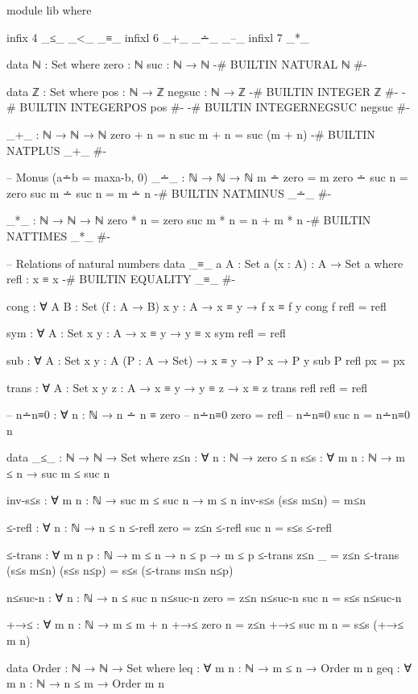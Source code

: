 \documentclass{article}
\begin{document}
\begin{prev}
\begin{code}
module lib where

infix 4 _≤_ _<_ _≡_
infixl 6 _+_ _∸_ _–_
infixl 7 _*_

data ℕ : Set where
    zero : ℕ
    suc : ℕ → ℕ
{-# BUILTIN NATURAL ℕ #-}

data ℤ : Set where
    pos : ℕ → ℤ
    negsuc : ℕ → ℤ
{-# BUILTIN INTEGER       ℤ    #-}
{-# BUILTIN INTEGERPOS    pos    #-}
{-# BUILTIN INTEGERNEGSUC negsuc #-}

_+_ : ℕ → ℕ → ℕ
zero + n = n
suc m + n = suc (m + n)
{-# BUILTIN NATPLUS _+_ #-}

-- Monus (a∸b = max{a-b, 0})
_∸_ : ℕ → ℕ → ℕ
m ∸ zero = m
zero ∸ suc n = zero
suc m ∸ suc n = m ∸ n
{-# BUILTIN NATMINUS _∸_ #-}

_*_ : ℕ → ℕ → ℕ
zero * n = zero
suc m * n = n + m * n
{-# BUILTIN NATTIMES _*_ #-}

-- Relations of natural numbers
data _≡_ {a} {A : Set a} (x : A) : A → Set a where
  refl : x ≡ x
{-# BUILTIN EQUALITY _≡_  #-}

cong : ∀ {A B : Set} (f : A → B) {x y : A} → x ≡ y → f x ≡ f y
cong f refl = refl

sym : ∀ {A : Set} {x y : A} → x ≡ y → y ≡ x
sym refl = refl

sub : ∀ {A : Set} {x y : A} (P : A → Set) → x ≡ y → P x → P y
sub P refl px = px

trans : ∀ {A : Set} {x y z : A} → x ≡ y → y ≡ z → x ≡ z
trans refl refl = refl

-- n∸n≡0 : ∀ {n : ℕ} → n ∸ n ≡ zero
-- n∸n≡0 {zero} = refl
-- n∸n≡0 {suc n} = n∸n≡0 {n}

data _≤_ : ℕ → ℕ → Set where
    z≤n : ∀ {n : ℕ} → zero ≤ n
    s≤s : ∀ {m n : ℕ} → m ≤ n → suc m ≤ suc n

inv-s≤s : ∀ {m n : ℕ} → suc m ≤ suc n → m ≤ n
inv-s≤s (s≤s m≤n) = m≤n

≤-refl : ∀ {n : ℕ} → n ≤ n
≤-refl {zero} = z≤n
≤-refl {suc n} = s≤s ≤-refl

≤-trans : ∀ {m n p : ℕ} → m ≤ n → n ≤ p → m ≤ p
≤-trans z≤n _ = z≤n
≤-trans (s≤s m≤n) (s≤s n≤p) = s≤s (≤-trans m≤n n≤p)

n≤suc-n : ∀ {n : ℕ} → n ≤ suc n
n≤suc-n {zero} = z≤n
n≤suc-n {suc n} = s≤s n≤suc-n

+→≤ : ∀ {m n : ℕ} → m ≤ m + n
+→≤ {zero} {n} = z≤n
+→≤ {suc m} {n} = s≤s (+→≤ {m} {n})

data Order : ℕ → ℕ → Set where
    leq : ∀ {m n : ℕ} → m ≤ n → Order m n
    geq : ∀ {m n : ℕ} → n ≤ m → Order m n


\end{code}
\end{prev}
\end{document}
